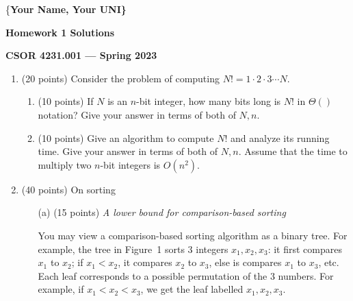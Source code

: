 \documentclass[11pt]{article}
\begin{document}
\centerline{\{\bf Your Name, Your UNI\}}
\centerline{\bf Homework 1 Solutions}
\centerline{\bf CSOR 4231.001 --- Spring 2023}

\bigskip 
\bigskip


\begin{enumerate}
\item (20 points) Consider the problem of computing $N!= 1\cdot 2 \cdot 3 \cdots N$.
\begin{enumerate}
\item (10 points) If $N$ is an $n$-bit integer, how many bits long is $N!$ in $\Theta()$ notation? Give your answer in terms of both of $N, n$.
\item (10 points) Give an algorithm to compute $N!$ and analyze its running time. Give your answer in terms of both of $N, n$.
Assume that the time to multiply two $n$-bit integers is $O(n^2)$.
\end{enumerate}

%
\bigskip
\item (40 points) On sorting
\begin{enumerate}
\item[(a)] (15 points) {\em A lower bound for comparison-based sorting}

You may view a comparison-based sorting algorithm as a binary 
tree. For example, the tree  in Figure~1
sorts 3 integers $x_1, x_2, x_3$: it first compares $x_1$ to $x_2$; 
if $x_1<x_2$, it compares $x_2$ to $x_3$, else is compares  $x_1$ to $x_3$, etc. 
Each leaf corresponds to a possible permutation of the 3 numbers. For example, 
if $x_1< x_2 < x_3$, we get the leaf labelled $x_1, x_2, x_3$.


\end{enumerate}
\end{enumerate}
\end{document}
